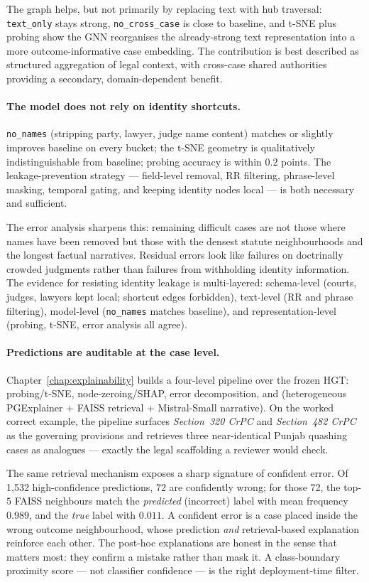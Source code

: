 The graph helps, but not primarily by replacing text with hub traversal: \texttt{text\_only} stays strong, \texttt{no\_cross\_case} is close to baseline, and t-SNE plus probing show the GNN reorganises the already-strong text representation into a more outcome-informative case embedding. The contribution is best described as structured aggregation of legal context, with cross-case shared authorities providing a secondary, domain-dependent benefit.

\paragraph{The model does not rely on identity shortcuts.} \texttt{no\_names} (stripping party, lawyer, judge name content) matches or slightly improves baseline on every bucket; the t-SNE geometry is qualitatively indistinguishable from baseline; probing accuracy is within $0.2$ points. The leakage-prevention strategy --- field-level removal, RR filtering, phrase-level masking, temporal gating, and keeping identity nodes local --- is both necessary and sufficient.

The error analysis sharpens this: remaining difficult cases are not those where names have been removed but those with the densest statute neighbourhoods and the longest factual narratives. Residual errors look like failures on doctrinally crowded judgments rather than failures from withholding identity information. The evidence for resisting identity leakage is multi-layered: schema-level (courts, judges, lawyers kept local; shortcut edges forbidden), text-level (RR and phrase filtering), model-level (\texttt{no\_names} matches baseline), and representation-level (probing, t-SNE, error analysis all agree).

\paragraph{Predictions are auditable at the case level.} Chapter~\ref{chap:explainability} builds a four-level pipeline over the frozen HGT: probing/t-SNE, node-zeroing/SHAP, error decomposition, and  (heterogeneous PGExplainer + FAISS retrieval + Mistral-Small narrative). On the worked correct example, the pipeline surfaces \emph{Section~320 CrPC} and \emph{Section~482 CrPC} as the governing provisions and retrieves three near-identical Punjab quashing cases as analogues --- exactly the legal scaffolding a reviewer would check.

The same retrieval mechanism exposes a sharp signature of confident error. Of 1{,}532 high-confidence predictions, 72 are confidently wrong; for those 72, the top-$5$ FAISS neighbours match the \emph{predicted} (incorrect) label with mean frequency $0.989$, and the \emph{true} label with $0.011$. A confident error is a case placed inside the wrong outcome neighbourhood, whose prediction \emph{and} retrieval-based explanation reinforce each other. The post-hoc explanations are honest in the sense that matters most: they confirm a mistake rather than mask it. A class-boundary proximity score --- not classifier confidence --- is the right deployment-time filter.


